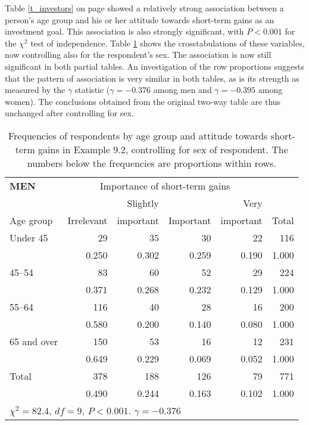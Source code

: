 Table \ref{t_investors} on page \pageref{t_investors} showed a
relatively strong association between a person's age group and his or
her attitude towards short-term gains as an investment goal. This
association is also strongly significant, with $P<0.001$ for the
$\chi^{2}$ test of independence.
Table \ref{t_investors3}
shows the crosstabulations of these variables, now controlling also for the
respondent's sex. The association is now still significant in both
partial tables. An investigation of the row proportions suggests that
the pattern of association is very similar in both tables, as is its
strength as measured by the $\gamma$ statistic ($\gamma=-0.376$ among
men and $\gamma=-0.395$ among women). The conclusions obtained from the
original two-way table are thus unchanged after controlling for sex.

\begin{table}[t]
\caption{
Frequencies of respondents by age group and attitude towards short-term
gains in Example 9.2, controlling for sex of respondent.
The numbers below the frequencies are proportions within rows.}
\label{t_investors3}
\begin{center}
\begin{tabular}{|l|rrrr|r|}\hline
\textbf{MEN}& \multicolumn{4}{|c|}{Importance of short-term gains } & \\
 & & Slightly & & Very & \\
Age group & Irrelevant & important & Important & important & Total \\ \hline
Under 45 &  29 &  35 &  30 &  22 & 116 \\
& 0.250 & 0.302 & 0.259 & 0.190 & 1.000 \\
45--54 &  83 &  60 &  52 &  29 & 224 \\
& 0.371 & 0.268 & 0.232 & 0.129 & 1.000 \\
55--64 & 116 &  40 &  28 &  16 & 200 \\
& 0.580 & 0.200 & 0.140 & 0.080 & 1.000 \\
65 and over &  150 &  53 &  16 &  12 & 231 \\
& 0.649 & 0.229 & 0.069 & 0.052 & 1.000 \\
\hline
Total & 378 & 188 & 126 & 79 & 771 \\
& 0.490 & 0.244 & 0.163 & 0.102 & 1.000 \\
\hline
\multicolumn{6}{l}{$\chi^{2}=82.4$, $df=9$, $P<0.001$.
$\gamma=-0.376$}
\end{tabular}
\end{center}


\end{table}
